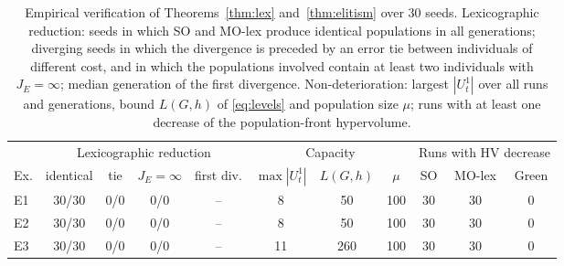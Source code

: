 \begin{table}[!htbp]
\centering
\caption{Empirical verification of Theorems~\ref{thm:lex} and~\ref{thm:elitism} over 30 seeds. Lexicographic reduction: seeds in which SO and MO-lex produce identical populations in all generations; diverging seeds in which the divergence is preceded by an error tie between individuals of different cost, and in which the populations involved contain at least two individuals with $J_E=\infty$; median generation of the first divergence. Non-deterioration: largest $|U_t^1|$ over all runs and generations, bound $L(G,h)$ of \eqref{eq:levels} and population size $\mu$; runs with at least one decrease of the population-front hypervolume.}
\label{tab:checks_K}
\small
\setlength{\tabcolsep}{4pt}
\begin{tabular}{lcccccccccc}
\toprule
 & \multicolumn{4}{c}{Lexicographic reduction} & \multicolumn{3}{c}{Capacity} & \multicolumn{3}{c}{Runs with HV decrease} \\
\cmidrule(lr){2-5}\cmidrule(lr){6-8}\cmidrule(lr){9-11}
Ex. & identical & tie & $J_E{=}\infty$ & first div. & $\max|U_t^1|$ & $L(G,h)$ & $\mu$ & SO & MO-lex & Green \\
\midrule
E1 & 30/30 & 0/0 & 0/0 & -- & 8 & 50 & 100 & 30 & 30 & 0 \\
E2 & 30/30 & 0/0 & 0/0 & -- & 8 & 50 & 100 & 30 & 30 & 0 \\
E3 & 30/30 & 0/0 & 0/0 & -- & 11 & 260 & 100 & 30 & 30 & 0 \\
\bottomrule
\end{tabular}
\end{table}
